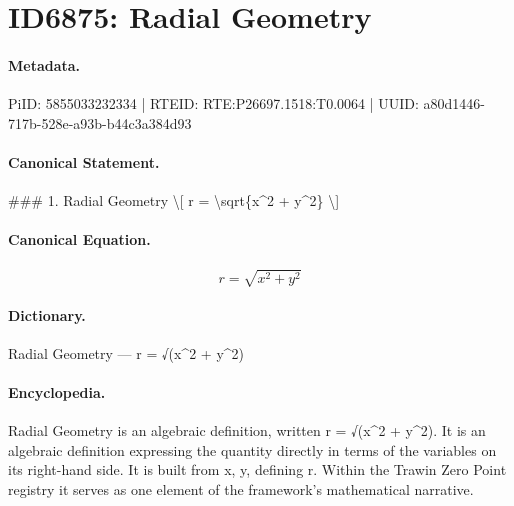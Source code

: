 \section*{ID6875: Radial Geometry}
\paragraph{Metadata.}
PiID: 5855033232334 | RTEID: RTE:P26697.1518:T0.0064 | UUID: a80d1446-717b-528e-a93b-b44c3a384d93

\paragraph{Canonical Statement.}
\#\#\# 1. Radial Geometry \textbackslash{}[ r = \textbackslash{}sqrt\{x\textasciicircum{}2 + y\textasciicircum{}2\} \textbackslash{}]

\paragraph{Canonical Equation.}
\[
r = \sqrt{x^2 + y^2}
\]

\paragraph{Dictionary.}
Radial Geometry — r = √(x\textasciicircum{}2 + y\textasciicircum{}2)

\paragraph{Encyclopedia.}
Radial Geometry is an algebraic definition, written r = √(x\textasciicircum{}2 + y\textasciicircum{}2). It is an algebraic definition expressing the quantity directly in terms of the variables on its right-hand side. It is built from x, y, defining r. Within the Trawin Zero Point registry it serves as one element of the framework's mathematical narrative.
